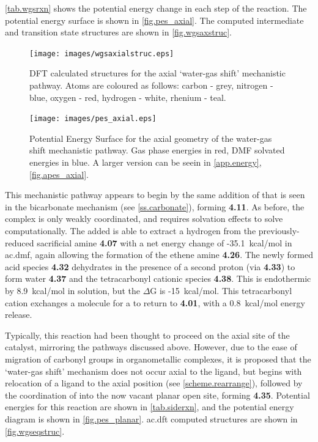 \autoref{tab.wgsrxn} shows the potential energy change in each step of the reaction. The potential energy surface is shown in \autoref{fig.pes_axial}. The computed intermediate and transition state structures are shown in \autoref{fig.wgsaxstruc}.



\begin{figure}[!htb]
 \begin{center}
  \texttt{[image: images/wgsaxialstruc.eps]}
 \end{center}
\caption[DFT calculated structures for the axial `water-gas shift' mechanistic pathway.]{DFT calculated structures for the axial `water-gas shift' mechanistic pathway. Atoms are coloured as follows: carbon - grey, nitrogen - blue, oxygen - red, hydrogen - white, rhenium - teal.}
\label{fig.wgsaxstruc}
\end{figure}

\begin{figure}[!htb]
 \begin{center}
  \texttt{[image: images/pes\_axial.eps]}
 \end{center}
\caption[Potential Energy Surface for the axial geometry of the water-gas shift mechanistic pathway.]{Potential Energy Surface for the axial geometry of the water-gas shift mechanistic pathway. Gas phase energies in red, DMF solvated energies in blue. A larger version can be seein in \autoref{app.energy}, \autoref{fig.apes_axial}.}
\label{fig.pes_axial}
\end{figure} 

This mechanistic pathway appears to begin by the same addition of  that is seen in the bicarbonate mechanism (see \autoref{ss.carbonate}), forming \textbf{4.11}. As before, the complex is only weakly coordinated, and requires solvation effects to solve computationally. The added  is able to extract a hydrogen from the previously-reduced sacrificial amine \textbf{4.07} with a net energy change of -35.1~kcal/mol in \gls{ac.dmf}, again allowing the formation of the ethene amine \textbf{4.26}. The newly formed acid species \textbf{4.32} dehydrates in the presence of a second proton (via \textbf{4.33}) to form water \textbf{4.37} and the tetracarbonyl cationic species \textbf{4.38}. This is endothermic by 8.9~kcal/mol in solution, but the $\Delta$G is -15~kcal/mol. This tetracarbonyl cation exchanges a  molecule for a  to return to \textbf{4.01}, with a 0.8~kcal/mol energy release. 

Typically, this reaction had been thought to proceed on the axial site of the catalyst, mirroring the pathways discussed above. However, due to the ease of migration of carbonyl groups in organometallic complexes, it is proposed that the `water-gas shift' mechanism does not occur axial to the ligand, but begins with relocation of a  ligand to the axial position (see \autoref{scheme.rearrange}), followed by the coordination of  into the now vacant planar open site, forming \textbf{4.35}. Potential energies for this reaction are shown in \autoref{tab.siderxn}, and the potential energy diagram is shown in \autoref{fig.pes_planar}. \Gls{ac.dft} computed structures are shown in \autoref{fig.wgseqstruc}. 

